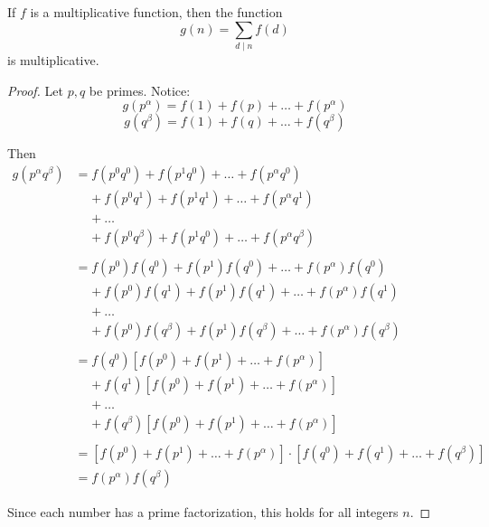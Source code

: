 \begin{prop}[part a]
    If $f$ is a multiplicative function, then the function
    \[ g(n) = \sum_{d \mid n} f(d) \]
    is multiplicative.
\end{prop}
\begin{proof}
    Let $p, q$ be primes.  Notice:
    \[ g(p^\alpha) = f(1) + f(p) + \ldots + f(p^\alpha) \]
    \[ g(q^\beta) = f(1) + f(q) + \ldots + f(q^\beta) \]
    
    Then
    \begin{align*}
    g(p^\alpha q^\beta) 
        &= f(p^0 q^0) + f(p^1 q^0) + \dots + f(p^\alpha q^0) \\
        & \;\;\;\; + f(p^0 q^1) + f(p^1 q^1) + \dots + f(p^\alpha q^1) \\
        & \;\;\;\; + \dots \\
        & \;\;\;\; + f(p^0 q^\beta) + f(p^1 q^0) + \ldots + f(p^\alpha q^\beta) \\
        \\    
        &= f(p^0)f(q^0) + f(p^1)f(q^0) + \dots + f(p^\alpha)f(q^0) \\
        & \;\;\;\; + f(p^0)f(q^1) + f(p^1)f(q^1) + \dots + f(p^\alpha)f(q^1) \\
        & \;\;\;\; + \dots \\
        & \;\;\;\; + f(p^0)f(q^\beta) + f(p^1)f(q^\beta) + \dots + f(p^\alpha)f(q^\beta) \\
        \\
        &= f(q^0)[f(p^0) + f(p^1) + \ldots + f(p^\alpha)] \\
        & \;\;\;\; + f(q^1)[f(p^0) + f(p^1) + \ldots + f(p^\alpha)] \\
        & \;\;\;\; + \ldots \\
        & \;\;\;\; + f(q^\beta)[f(p^0) + f(p^1) + \ldots + f(p^\alpha)] \\
        \\
        &= [f(p^0) + f(p^1) + \ldots + f(p^\alpha)] \cdot [f(q^0) + f(q^1) + \ldots + f(q^\beta)] \\
        &= f(p^\alpha)f(q^\beta)
    \end{align*}
    
    Since each number has a prime factorization, this holds for all integers
    $n$.
\end{proof}


